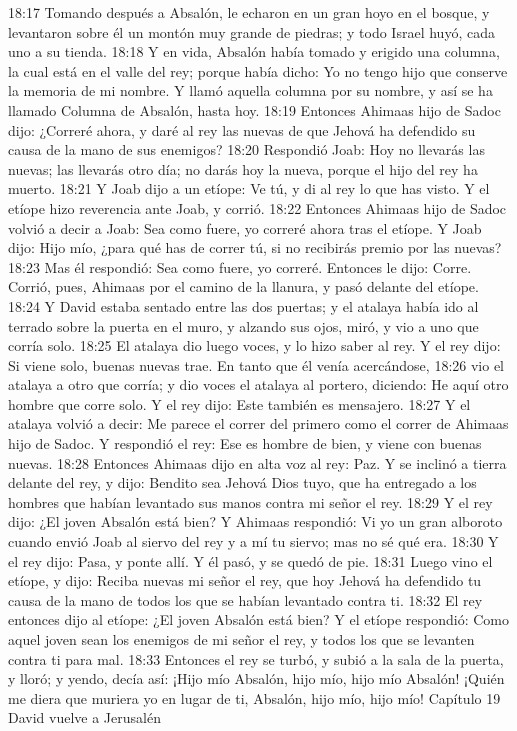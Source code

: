18:17 Tomando después a Absalón, le echaron en un gran hoyo en el bosque, y levantaron sobre él un montón muy grande de piedras; y todo Israel huyó, cada uno a su tienda.  
18:18 Y en vida, Absalón había tomado y erigido una columna, la cual está en el valle del rey; porque había dicho: Yo no tengo hijo que conserve la memoria de mi nombre. Y llamó aquella columna por su nombre, y así se ha llamado Columna de Absalón, hasta hoy.  
18:19 Entonces Ahimaas hijo de Sadoc dijo: ¿Correré ahora, y daré al rey las nuevas de que Jehová ha defendido su causa de la mano de sus enemigos?  
18:20 Respondió Joab: Hoy no llevarás las nuevas; las llevarás otro día; no darás hoy la nueva, porque el hijo del rey ha muerto.  
18:21 Y Joab dijo a un etíope: Ve tú, y di al rey lo que has visto. Y el etíope hizo reverencia ante Joab, y corrió.  
18:22 Entonces Ahimaas hijo de Sadoc volvió a decir a Joab: Sea como fuere, yo correré ahora tras el etíope. Y Joab dijo: Hijo mío, ¿para qué has de correr tú, si no recibirás premio por las nuevas?  
18:23 Mas él respondió: Sea como fuere, yo correré. Entonces le dijo: Corre. Corrió, pues, Ahimaas por el camino de la llanura, y pasó delante del etíope.  
18:24 Y David estaba sentado entre las dos puertas; y el atalaya había ido al terrado sobre la puerta en el muro, y alzando sus ojos, miró, y vio a uno que corría solo.  
18:25 El atalaya dio luego voces, y lo hizo saber al rey. Y el rey dijo: Si viene solo, buenas nuevas trae. En tanto que él venía acercándose,  
18:26 vio el atalaya a otro que corría; y dio voces el atalaya al portero, diciendo: He aquí otro hombre que corre solo. Y el rey dijo: Este también es mensajero.  
18:27 Y el atalaya volvió a decir: Me parece el correr del primero como el correr de Ahimaas hijo de Sadoc. Y respondió el rey: Ese es hombre de bien, y viene con buenas nuevas.  
18:28 Entonces Ahimaas dijo en alta voz al rey: Paz. Y se inclinó a tierra delante del rey, y dijo: Bendito sea Jehová Dios tuyo, que ha entregado a los hombres que habían levantado sus manos contra mi señor el rey.  
18:29 Y el rey dijo: ¿El joven Absalón está bien? Y Ahimaas respondió: Vi yo un gran alboroto cuando envió Joab al siervo del rey y a mí tu siervo; mas no sé qué era.  
18:30 Y el rey dijo: Pasa, y ponte allí. Y él pasó, y se quedó de pie.  
18:31 Luego vino el etíope, y dijo: Reciba nuevas mi señor el rey, que hoy Jehová ha defendido tu causa de la mano de todos los que se habían levantado contra ti.  
18:32 El rey entonces dijo al etíope: ¿El joven Absalón está bien? Y el etíope respondió: Como aquel joven sean los enemigos de mi señor el rey, y todos los que se levanten contra ti para mal.  
18:33 Entonces el rey se turbó, y subió a la sala de la puerta, y lloró; y yendo, decía así: ¡Hijo mío Absalón, hijo mío, hijo mío Absalón! ¡Quién me diera que muriera yo en lugar de ti, Absalón, hijo mío, hijo mío! 
Capítulo 19 
David vuelve a Jerusalén  

